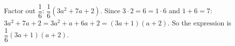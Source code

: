 Factor out $\dfrac16$: $\dfrac16(3a^2+7a+2)$. Since $3\cdot2=6=1\cdot6$ and $1+6=7$: $3a^2+7a+2=3a^2+a+6a+2=(3a+1)(a+2)$. So the expression is $\boxed{\dfrac16(3a+1)(a+2)}$.
